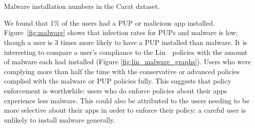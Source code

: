 \documentclass[thesis.tex]{subfiles}
\begin{document}
\begin{marginfigure}
  \centering
  \\
  \\
  \caption{Malware installation numbers in the Carat dataset.}
  \label{fig:malware}
\end{marginfigure}
We found that 1\% of the users had a \ac{PUP} or malicious app installed.
Figure~\ref{fig:malware} shows that infection rates for \acp{PUP} and malware is low;
though a user is 3 times more likely to have a \ac{PUP} installed than malware.
It is interesting to compare a user's compliance to the Lin~\etal~policies with the amount of malware each had installed (Figure \autoref{fig:lin_malware_graphs}).
Users who were complying more than half the time with the conservative or advanced policies complied with the malware or \ac{PUP} policies fully.
This suggests that policy enforcement is worthwhile: users who do enforce policies about their apps experience less malware.
This could also be attributed to the users needing to be more selective about their apps in order to enforce their policy: a careful user is unlikely to install malware generally.
\end{document}
